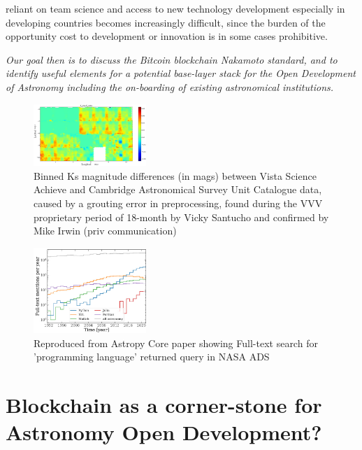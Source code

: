 \documentclass[final,5p,times,twocolumn,authoryear]{elsarticle}
\begin{document}
reliant on team science and access to new technology development especially in developing countries becomes increasingly difficult, since the burden of the opportunity cost to development or innovation is in some cases  prohibitive.

\emph{Our goal then is to discuss the Bitcoin blockchain Nakamoto standard, and to identify useful elements for a potential base-layer stack for the Open Development of Astronomy including the on-boarding of existing astronomical institutions.}

\begin{figure}
    \centering
    \includegraphics[width=0.38\textwidth]{figs/mapa_dif_Kvsa_Kcasu_grid80_1}
    \vspace*{-0.2cm}
    \caption{Binned Ks magnitude differences (in mags) between Vista Science Achieve and Cambridge Astronomical Survey Unit Catalogue data, caused by a grouting error in preprocessing, found during the VVV proprietary period of 18-month by Vicky Santucho and confirmed by Mike Irwin (priv communication)}
    \label{fig:mapa_dif_Kvsa_Kcasu_grid80_1}
\end{figure}


\begin{figure}
    \centering
    \includegraphics[width=0.38\textwidth]{figs/2206.14220.jpg}
    \vspace*{-0.3cm}
    \caption{Reproduced from Astropy Core paper showing Full-text search for 'programming language' returned query in NASA ADS}
    \label{fig:astropy}
\end{figure}

\section{Blockchain as a corner-stone for Astronomy Open Development?}
\label{sec:bc_review}
\end{document}
